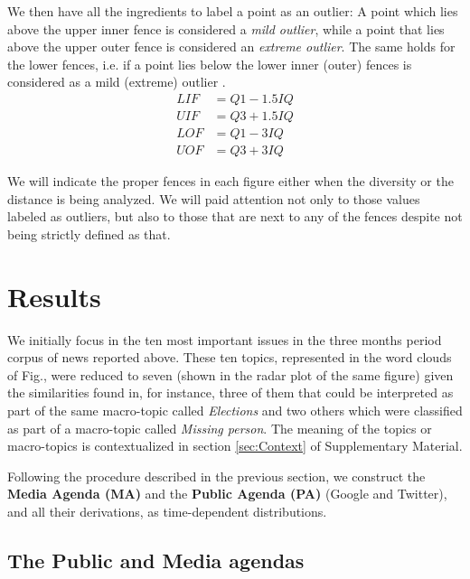 \documentclass{bmcart}
\begin{document}
We then have all the ingredients to label a point as an outlier: A point which lies above the upper inner fence is considered a \emph{mild outlier}, while a point that lies above the upper outer fence is considered an \emph{extreme outlier}. The same holds for the lower fences, i.e. if a point lies below the lower inner (outer) fences is considered as a mild (extreme) outlier \cite{natrella2010nist}. 
\begin{eqnarray}\label{eq:fences}
LIF & = Q1 - 1.5 IQ \nonumber \\
UIF & = Q3 + 1.5 IQ \nonumber\\
LOF & = Q1 - 3 IQ \nonumber \\
UOF & = Q3 + 3 IQ
\end{eqnarray}
\par We will indicate the proper fences in each figure either when the diversity or the distance is being analyzed. We will paid attention not only to those values labeled as outliers, but also to those that are next to any of the fences despite not being strictly defined as that.

\section*{Results}
\label{results}

\par We initially focus in the ten most important issues in the three months period corpus of news reported above. These ten topics, represented in the word clouds  of Fig.\label{fig:topics_wordclouds}, were reduced to seven (shown in the radar plot of the same figure) given the similarities found in, for instance, three of them that could be interpreted as part of the same macro-topic called \emph{Elections} and two others which were classified as part of a macro-topic called \emph{Missing person}. The meaning of the topics or macro-topics is contextualized in section \ref{sec:Context} of Supplementary Material. 
\par Following the procedure described in the previous section, we construct the \textbf{Media Agenda (MA)} and the \textbf{Public Agenda (PA)} (Google and Twitter), and all their derivations, as time-dependent distributions. 

\subsection*{The Public and Media agendas}
\end{document}
